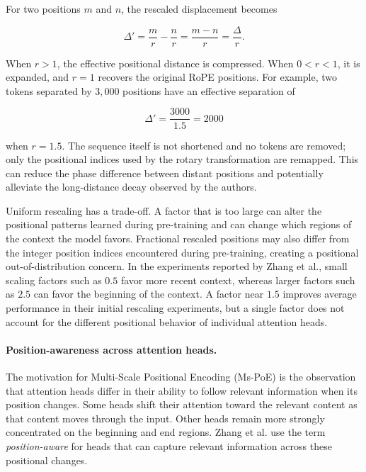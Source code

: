 For two positions \(m\) and \(n\), the rescaled displacement becomes

\begin{equation}
    \Delta'
    =
    \frac{m}{r}-\frac{n}{r}
    =
    \frac{m-n}{r}
    =
    \frac{\Delta}{r}.
    \label{eq:pe-rescaled-displacement}
\end{equation}

When \(r>1\), the effective positional distance is compressed. When
\(0<r<1\), it is expanded, and \(r=1\) recovers the original RoPE
positions. For example, two tokens separated by \(3{,}000\) positions
have an effective separation of

\begin{equation}
    \Delta'=\frac{3000}{1.5}=2000
    \label{eq:pe-rescaling-numeric-example}
\end{equation}

when \(r=1.5\). The sequence itself is not shortened and no tokens are
removed; only the positional indices used by the rotary transformation
are remapped. This can reduce the phase difference between distant
positions and potentially alleviate the long-distance decay observed by
the authors.

Uniform rescaling has a trade-off. A factor that is too large can alter
the positional patterns learned during pre-training and can change which
regions of the context the model favors. Fractional rescaled positions
may also differ from the integer position indices encountered during
pre-training, creating a positional out-of-distribution concern. In the
experiments reported by Zhang et al., small scaling factors such as
\(0.5\) favor more recent context, whereas larger factors such as \(2.5\)
can favor the beginning of the context. A factor near \(1.5\) improves
average performance in their initial rescaling experiments, but a single
factor does not account for the different positional behavior of
individual attention heads.

\paragraph{Position-awareness across attention heads.}
The motivation for Multi-Scale Positional Encoding (Ms-PoE) is the
observation that attention heads differ in their ability to follow relevant
information when its position changes. Some heads shift their attention
toward the relevant content as that content moves through the input.
Other heads remain more strongly concentrated on the beginning and end
regions. Zhang et al. use the term \emph{position-aware} for heads that
can capture relevant information across these positional changes.


